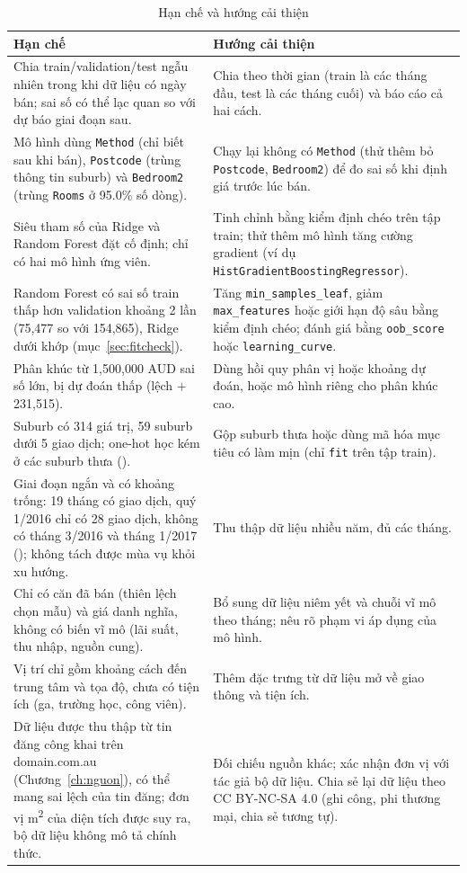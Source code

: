 \begin{table}[H]
\centering
\caption{Hạn chế và hướng cải thiện}\label{tab:hanche}
\small
\begin{tabular}{@{}L{7.0cm} L{6.7cm}@{}}
\toprule
Hạn chế & Hướng cải thiện \\
\midrule
Chia train/validation/test ngẫu nhiên trong khi dữ liệu có ngày bán; sai số có thể lạc quan so với dự báo giai đoạn sau. & Chia theo thời gian (train là các tháng đầu, test là các tháng cuối) và báo cáo cả hai cách. \\
Mô hình dùng \texttt{Method} (chỉ biết sau khi bán), \texttt{Postcode} (trùng thông tin suburb) và \texttt{Bedroom2} (trùng \texttt{Rooms} ở 95.0\% số dòng). & Chạy lại không có \texttt{Method} (thử thêm bỏ \texttt{Postcode}, \texttt{Bedroom2}) để đo sai số khi định giá trước lúc bán. \\
Siêu tham số của Ridge và Random Forest đặt cố định; chỉ có hai mô hình ứng viên. & Tinh chỉnh bằng kiểm định chéo trên tập train; thử thêm mô hình tăng cường gradient (ví dụ \texttt{HistGradientBoostingRegressor}). \\
Random Forest có sai số train thấp hơn validation khoảng 2 lần (75,477 so với 154,865), Ridge dưới khớp (mục~\ref{sec:fitcheck}). & Tăng \texttt{min\_samples\_leaf}, giảm \texttt{max\_features} hoặc giới hạn độ sâu bằng kiểm định chéo; đánh giá bằng \texttt{oob\_score} hoặc \texttt{learning\_curve}. \\
Phân khúc từ 1,500,000 AUD sai số lớn, bị dự đoán thấp (lệch $+$231,515). & Dùng hồi quy phân vị hoặc khoảng dự đoán, hoặc mô hình riêng cho phân khúc cao. \\
Suburb có 314 giá trị, 59 suburb dưới 5 giao dịch; one-hot học kém ở các suburb thưa (). & Gộp suburb thưa hoặc dùng mã hóa mục tiêu có làm mịn (chỉ \texttt{fit} trên tập train). \\
Giai đoạn ngắn và có khoảng trống: 19 tháng có giao dịch, quý 1/2016 chỉ có 28 giao dịch, không có tháng 3/2016 và tháng 1/2017 (); không tách được mùa vụ khỏi xu hướng. & Thu thập dữ liệu nhiều năm, đủ các tháng. \\
Chỉ có căn đã bán (thiên lệch chọn mẫu) và giá danh nghĩa, không có biến vĩ mô (lãi suất, thu nhập, nguồn cung). & Bổ sung dữ liệu niêm yết và chuỗi vĩ mô theo tháng; nêu rõ phạm vi áp dụng của mô hình. \\
Vị trí chỉ gồm khoảng cách đến trung tâm và tọa độ, chưa có tiện ích (ga, trường học, công viên). & Thêm đặc trưng từ dữ liệu mở về giao thông và tiện ích. \\
Dữ liệu được thu thập từ tin đăng công khai trên domain.com.au (Chương~\ref{ch:nguon}), có thể mang sai lệch của tin đăng; đơn vị m\textsuperscript{2} của diện tích được suy ra, bộ dữ liệu không mô tả chính thức. & Đối chiếu nguồn khác; xác nhận đơn vị với tác giả bộ dữ liệu. Chia sẻ lại dữ liệu theo CC BY-NC-SA 4.0 (ghi công, phi thương mại, chia sẻ tương tự). \\
\bottomrule
\end{tabular}
\end{table}

